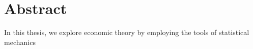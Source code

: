 \chapter*{Abstract}

In this thesis, we explore economic theory by employing the tools of statistical mechanics
